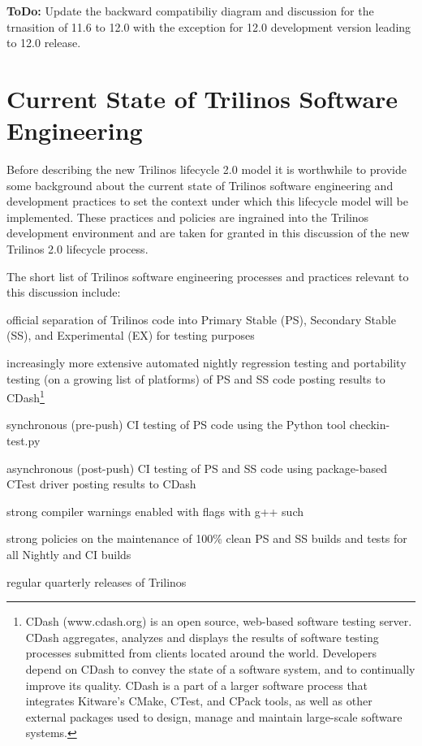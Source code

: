 \documentclass[11pt]{SANDreport}
\begin{document}
{}\textbf{ToDo:} Update the backward compatibiliy diagram and
discussion for the trnasition of 11.6 to 12.0 with the exception for
12.0 development version leading to 12.0 release.

%
{}\section{Current State of Trilinos Software Engineering}
\label{sec:trilinos_current_state}
%

Before describing the new Trilinos lifecycle 2.0 model it is worthwhile
to provide some background about the current state of Trilinos
software engineering and development practices to set the context
under which this lifecycle model will be implemented.  These
practices and policies are ingrained into the Trilinos development
environment and are taken for granted in this discussion of the new
Trilinos 2.0 lifecycle process.

The short list of Trilinos software engineering processes and
practices relevant to this discussion include:
%
\begin{compactitem}
%
{}\item official separation of Trilinos code into Primary
Stable (PS), Secondary Stable (SS), and Experimental (EX) for testing
purposes
%
{}\item increasingly more extensive automated nightly regression
testing and portability testing (on a growing list of platforms) of PS
and SS code posting results to CDash\footnote{CDash (www.cdash.org) is
an open source, web-based software testing server. CDash aggregates,
analyzes and displays the results of software testing processes
submitted from clients located around the world. Developers depend on
CDash to convey the state of a software system, and to continually
improve its quality. CDash is a part of a larger software process that
integrates Kitware's CMake, CTest, and CPack tools, as well as other
external packages used to design, manage and maintain large-scale
software systems.}
%
{}\item synchronous (pre-push) CI testing of PS code using the Python
tool checkin-test.py
%
{}\item asynchronous (post-push) CI testing of PS and SS code using
package-based CTest driver posting results to CDash
%
{}\item strong compiler warnings enabled with flags with g++ such
{}
%
{}\item strong policies on the maintenance of 100\% clean PS and SS
builds and tests for all Nightly and CI builds
%
{}\item regular quarterly releases of Trilinos
%
\end{compactitem}
\end{document}
